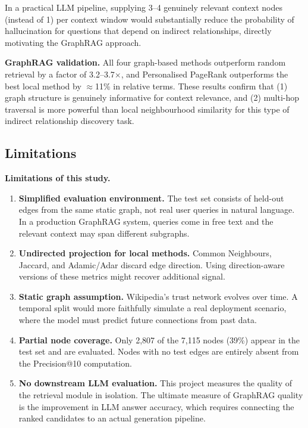 \documentclass[10pt]{article}
\begin{document}
In a practical LLM pipeline, supplying 3--4 genuinely relevant context nodes (instead of 1) per context window would substantially reduce the probability of hallucination for questions that depend on indirect relationships, directly motivating the GraphRAG approach.

\begin{successbox}
\textbf{GraphRAG validation.} All four graph-based methods outperform random retrieval by a factor of 3.2--3.7$\times$, and Personalised PageRank outperforms the best local method by $\approx$11\% in relative terms. These results confirm that (1) graph structure is genuinely informative for context relevance, and (2) multi-hop traversal is more powerful than local neighbourhood similarity for this type of indirect relationship discovery task.
\end{successbox}

\subsection{Limitations}

\begin{limitbox}
\textbf{Limitations of this study.}
\begin{enumerate}
  \item \textbf{Simplified evaluation environment.} The test set consists of held-out edges from the same static graph, not real user queries in natural language. In a production GraphRAG system, queries come in free text and the relevant context may span different subgraphs.
  \item \textbf{Undirected projection for local methods.} Common Neighbours, Jaccard, and Adamic/Adar discard edge direction. Using direction-aware versions of these metrics might recover additional signal.
  \item \textbf{Static graph assumption.} Wikipedia's trust network evolves over time. A temporal split would more faithfully simulate a real deployment scenario, where the model must predict future connections from past data.
  \item \textbf{Partial node coverage.} Only 2,807 of the 7,115 nodes (39\%) appear in the test set and are evaluated. Nodes with no test edges are entirely absent from the Precision@10 computation.
  \item \textbf{No downstream LLM evaluation.} This project measures the quality of the retrieval module in isolation. The ultimate measure of GraphRAG quality is the improvement in LLM answer accuracy, which requires connecting the ranked candidates to an actual generation pipeline.
\end{enumerate}
\end{limitbox}
\end{document}
